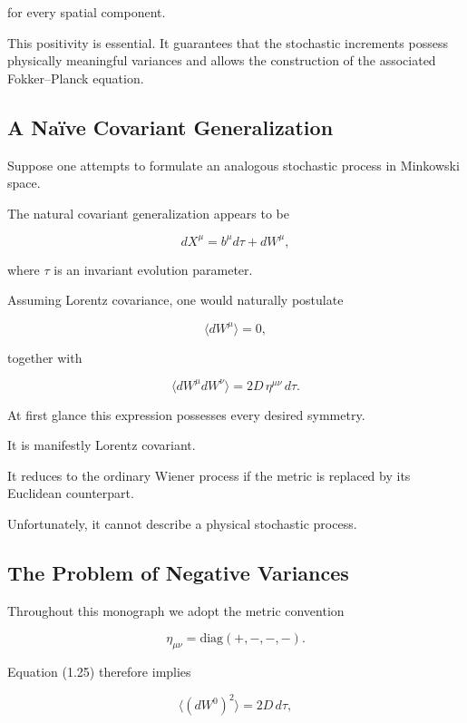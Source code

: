 for every spatial component.

This positivity is essential. It guarantees that the stochastic
increments possess physically meaningful variances and allows the
construction of the associated Fokker--Planck equation.

\subsection{A Na\"ive Covariant Generalization}

Suppose one attempts to formulate an analogous stochastic process in
Minkowski space.

The natural covariant generalization appears to be

\[
dX^\mu
=
b^\mu d\tau
+
dW^\mu ,
\]

where \(\tau\) is an invariant evolution parameter.

Assuming Lorentz covariance, one would naturally postulate

\[
\langle dW^\mu\rangle =0,
\]

together with

\[
\boxed{
\langle
dW^\mu dW^\nu
\rangle
=
2D\,\eta^{\mu\nu}\,d\tau .
}
\]

At first glance this expression possesses every desired symmetry.

It is manifestly Lorentz covariant.

It reduces to the ordinary Wiener process if the metric is replaced by
its Euclidean counterpart.

Unfortunately, it cannot describe a physical stochastic process.

\subsection{The Problem of Negative Variances}

Throughout this monograph we adopt the metric convention

\[
\eta_{\mu\nu}
=
\mathrm{diag}(+,-,-,-).
\]

Equation (1.25) therefore implies

\[
\langle
(dW^0)^2
\rangle
=
2D\,d\tau ,
\]


